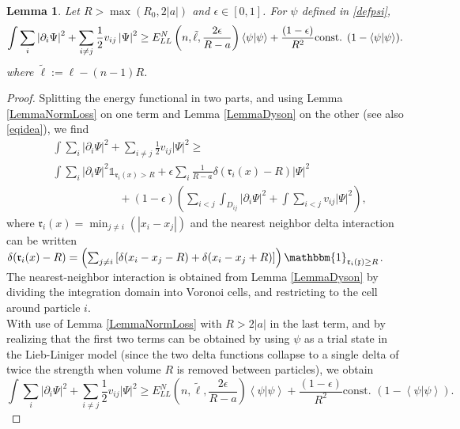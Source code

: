\documentclass[a4paper,11pt]{article}
\newcommand{\abs}[1]{\left\lvert #1 \right\rvert}
\renewcommand{\braket}[1]{\left\langle#1\right\rangle}
\newtheorem{lemma}[theorem]{Lemma}
\numberwithin{equation}{section}
\begin{document}
	\begin{lemma}\label{LemmaNormBoundEpsilon}
		 Let $R>\max\left(R_0,2\abs{a}\right) $ and $ \epsilon\in[0,1] $. For $ \psi $ defined in \eqref{defpsi},
		\begin{equation}
		\int \sum_{i}\abs{\partial_i\Psi}^2+\sum_{i\neq j} \frac{1}{2}v_{ij}\abs{\Psi}^2\geq E_{LL}^N \left(n,\tilde{\ell},\frac{2\epsilon}{R-a}\right)\braket{\psi|\psi}+ \frac{(1-\epsilon)}{R^2}\textnormal{const. }(1-\braket{\psi|\psi}).
		\end{equation}
		where $ \tilde{\ell}:=\ell-(n-1)R $.
	\end{lemma}
	\begin{proof}
		Splitting the energy functional in two parts, and using Lemma \ref{LemmaNormLoss} on one term and Lemma \ref{LemmaDyson} on the other (see also \eqref{eqidea}), we find 
		\begin{equation}
		\begin{aligned}
		&\int \sum_{i}\abs{\partial_i\Psi}^2+\sum_{i\neq j} \frac{1}{2}v_{ij}\abs{\Psi}^2\geq\\ &\int\sum_{i}\abs{\partial_i\Psi}^2\mathds{1}_{\mathfrak{r}_i(x)>R}+\epsilon\sum_{i}\frac{1}{R-a}\delta(\mathfrak{r}_i(x)-R)\abs{\Psi}^2\\&\qquad\qquad\qquad+ (1-\epsilon)\left(\sum_{i<j}\int_{D_{ij}}\abs{\partial_i \Psi}^2+\int\sum_{i<j} v_{ij} \abs{\Psi}^2\right),
		\end{aligned}
		\end{equation}
		where $ \mathfrak{r}_i(x)=\min_{j\neq i}(\abs{x_i-x_j}) $ and the nearest neighbor delta interaction can be written $\delta(\mathfrak{r}_i(x)-R)=\left(\sum_{j\neq i}\left[\delta(x_i-x_j-R)+\delta(x_i-x_j+R)\right]\right)\mathbbm{1}_{\mathfrak{r_i(x)}\geq R}$. The nearest-neighbor interaction is obtained from Lemma \ref{LemmaDyson} by dividing the integration domain into Voronoi cells, and restricting to the cell around particle $ i $.\\
		With use of Lemma \ref{LemmaNormLoss} with $ R>2\abs{a} $ in the last term, and by realizing that the first two terms can be obtained by using $ \psi $ as a trial state in the Lieb-Liniger model (since the two delta functions collapse to a single delta of twice the strength when volume $R$ is removed between particles), we obtain\begin{equation}
		\int \sum_{i}\abs{\partial_i\Psi}^2+\sum_{i\neq j} \frac{1}{2}v_{ij}\abs{\Psi}^2\geq E_{LL}^N \left(n,\tilde{\ell},\frac{2\epsilon}{R-a}\right)\braket{\psi|\psi}+ \frac{(1-\epsilon)}{R^2}\text{const. }(1-\braket{\psi|\psi}).
		\end{equation}
	\end{proof}
	
\end{document}
